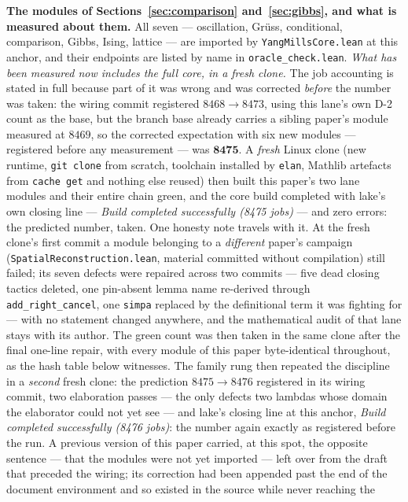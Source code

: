 \documentclass[11pt]{article}
\theoremstyle{definition}
\begin{document}
\textbf{The modules of Sections~\ref{sec:comparison} and~\ref{sec:gibbs}, and
what is measured about them.}  All seven --- oscillation, Gr\"uss,
conditional, comparison, Gibbs, Ising, lattice --- are imported by
\texttt{YangMillsCore.lean} at
this anchor, and their endpoints are listed by name in
\texttt{oracle\_check.lean}.  \emph{What has been measured now includes the
full core, in a fresh clone.}  The job accounting is stated in full because
part of it was wrong and was corrected \emph{before} the number was taken:
the wiring commit registered $8468\to8473$, using this lane's own D-2 count
as the base, but the branch base already carries a sibling paper's module
measured at $8469$, so the corrected expectation with six new modules ---
registered before any measurement --- was $\mathbf{8475}$.  A \emph{fresh}
Linux clone (new runtime, \texttt{git clone} from scratch, toolchain
installed by \texttt{elan}, Mathlib artefacts from \texttt{cache get} and
nothing else reused) then built this paper's two lane modules and their
entire chain green, and the core build completed with lake's own closing
line --- \emph{Build completed successfully (8475 jobs)} --- and zero
errors: the predicted number, taken.  One honesty note travels with it.  At
the fresh clone's first commit a module belonging to a \emph{different}
paper's campaign (\texttt{SpatialReconstruction.lean}, material committed
without compilation) still failed; its seven defects were repaired across
two commits --- five dead closing tactics deleted, one pin-absent lemma name
re-derived through \texttt{add\_right\_cancel}, one \texttt{simpa} replaced
by the definitional term it was fighting for --- with no statement changed
anywhere, and the mathematical audit of that lane stays with its author.
The green count was then taken in the same clone after the final one-line
repair, with every module of this paper byte-identical throughout, as the
hash table below witnesses.  The family rung then repeated the discipline
in a \emph{second} fresh clone: the prediction $8475\to8476$ registered in
its wiring commit, two elaboration passes --- the only defects two lambdas
whose domain the elaborator could not yet see --- and lake's closing line at
this anchor, \emph{Build completed successfully (8476 jobs)}: the number
again exactly as registered before the run.
A previous version of this paper carried, at this spot, the opposite sentence
--- that the modules were not yet imported --- left over from the draft that
preceded the wiring; its correction had been appended past the end of the
document environment and so existed in the source while never reaching the
\end{document}
